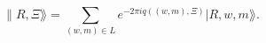 \begin{equation}
\label{eq:bdystateXi}
  \lVert R, \Xi \rAngle = \sum_{(w,m) \in L} e^{-2 \pi i q((w,m), \Xi)}
  \lvert R, w,m \rAngle.
\end{equation}

